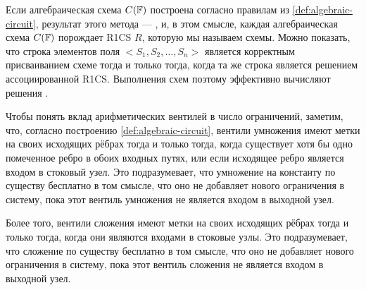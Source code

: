 Если алгебраическая схема $C(\mathbb{F})$ построена согласно правилам из \ref{def:algebraic-circuit}, результат этого метода — , и, в этом смысле, каждая алгебраическая схема $C(\mathbb{F})$ порождает R1CS $R$, которую мы называем  схемы. Можно показать, что строка элементов поля $<S_1,S_2,\ldots, S_n>$ является корректным присваиванием схеме тогда и только тогда, когда та же строка является решением ассоциированной R1CS. Выполнения схем поэтому эффективно вычисляют решения .

Чтобы понять вклад арифметических вентилей в число ограничений, заметим, что,
согласно построению \ref{def:algebraic-circuit}, вентили умножения имеют метки на своих исходящих рёбрах тогда и только тогда, когда существует хотя бы одно помеченное ребро в обоих входных путях, или если исходящее ребро является входом в стоковый узел. Это подразумевает, что умножение на константу по существу бесплатно в том смысле, что оно не добавляет нового ограничения в систему, пока этот вентиль умножения не является входом в выходной узел.

Более того, вентили сложения имеют метки на своих исходящих рёбрах тогда и только тогда, когда они являются входами в стоковые узлы. Это подразумевает, что сложение по существу бесплатно в том смысле, что оно не добавляет нового ограничения в систему, пока этот вентиль сложения не является входом в выходной узел.

